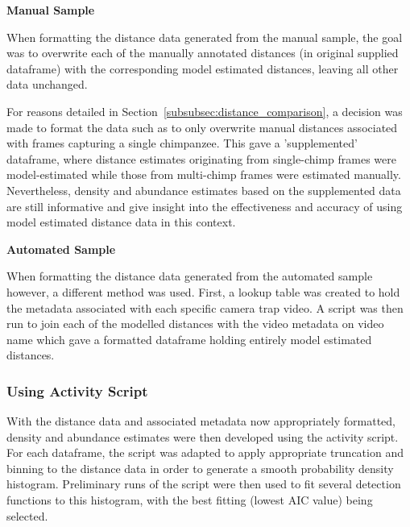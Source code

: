 \vspace{5mm}
\textbf{Manual Sample}

When formatting the distance data generated from the manual sample, the goal was to
overwrite each of the manually annotated distances (in original supplied dataframe)
with the corresponding model estimated distances, leaving all other data unchanged.

For reasons detailed in Section~\ref{subsubsec:distance_comparison}, a decision was
made to format the data such as to only overwrite manual distances associated with
frames capturing a single chimpanzee.
This gave a 'supplemented' dataframe, where distance estimates originating from
single-chimp frames were model-estimated while those from multi-chimp frames were
estimated manually.
Nevertheless, density and abundance estimates based on the supplemented data are still
informative and give insight into the effectiveness and accuracy of using model estimated
distance data in this context.

\vspace{5mm}
\textbf{Automated Sample}

When formatting the distance data generated from the automated sample however, a
different method was used.
First, a lookup table was created to hold the metadata associated with each specific
camera trap video.
A script was then run to join each of the modelled distances with the video metadata
on video name which gave a formatted dataframe holding entirely model estimated distances.

\subsubsection{Using Activity Script}

With the distance data and associated metadata now appropriately formatted, density
and abundance estimates were then developed using the activity script.
For each dataframe, the script was adapted to apply appropriate truncation and binning
to the distance data in order to generate a smooth probability density histogram.
Preliminary runs of the script were then used to fit several detection functions to
this histogram, with the best fitting (lowest AIC value) being selected.